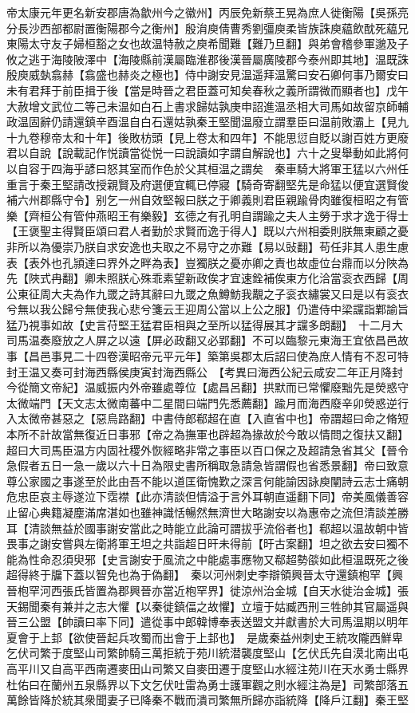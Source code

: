 帝太康元年更名新安郡唐為歙州今之徽州】丙辰免新蔡王晃為庶人徙衡陽【吳孫亮分長沙西部都尉置衡陽郡今之衡州】殷㳙庾倩曹秀劉彊庾柔皆族誅庾藴飲酖死藴兄東陽太守友子婦桓豁之女也故温特赦之庾希聞難【難乃旦翻】與弟會稽參軍邈及子攸之逃于海陵陂澤中【海陵縣前漢屬臨淮郡後漢晉屬廣陵郡今泰州即其地】温既誅殷庾威埶翕赫【翕盛也赫炎之極也】侍中謝安見温遥拜温驚曰安石卿何事乃爾安曰未有君拜于前臣揖于後【當是時晉之君臣蓋可知矣春秋之義所謂微而顯者也】戊午大赦增文武位二等己未温如白石上書求歸姑孰庚申詔進温丞相大司馬如故留京師輔政温固辭仍請還鎮辛酉温自白石還姑孰秦王堅聞温廢立謂羣臣曰温前敗灞上【見九十九卷穆帝太和十年】後敗枋頭【見上卷太和四年】不能思愆自貶以謝百姓方更廢君以自說【說載記作悦讀當從悦一曰說讀如字謂自解說也】六十之叟舉動如此將何以自容于四海乎諺曰怒其室而作色於父其桓温之謂矣　秦車騎大將軍王猛以六州任重言于秦王堅請改授親賢及府選便宜輒已停寢【騎奇寄翻堅先是命猛以便宜選賢俊補六州郡縣守令】别乞一州自效堅報曰朕之于卿義則君臣親踰骨肉雖復桓昭之有管樂【齊桓公有管仲燕昭王有樂毅】玄德之有孔明自謂踰之夫人主勞于求才逸于得士【王褒聖主得賢臣頌曰君人者勤於求賢而逸于得人】既以六州相委則朕無東顧之憂非所以為優崇乃朕自求安逸也夫取之不易守之亦難【易以䜴翻】苟任非其人患生慮表【表外也孔頴達曰界外之畔為表】豈獨朕之憂亦卿之責也故虛位台鼎而以分陜為先【陜式冉翻】卿未照朕心殊乖素望新政俟才宜速銓補俟東方化洽當衮衣西歸【周公東征周大夫為作九罭之詩其辭曰九罭之魚鱒魴我覯之子衮衣繡裳又曰是以有衮衣兮無以我公歸兮無使我心悲兮箋云王迎周公當以上公之服】仍遣侍中梁讜詣鄴諭旨猛乃視事如故【史言苻堅王猛君臣相與之至所以猛得展其才讜多朗翻】　十二月大司馬温奏廢放之人屏之以遠【屏必政翻又必郢翻】不可以臨黎元東海王宜依昌邑故事【昌邑事見二十四卷漢昭帝元平元年】築第吳郡太后詔曰使為庶人情有不忍可特封王温又奏可封海西縣侯庚寅封海西縣公　【考異曰海西公紀云咸安二年正月降封今從簡文帝紀】温威振内外帝雖處尊位【處昌呂翻】拱默而已常懼廢黜先是熒惑守太微端門【天文志太微南蕃中二星間曰端門先悉薦翻】踰月而海西廢辛卯熒惑逆行入太微帝甚惡之【惡烏路翻】中書侍郎郗超在直【入直省中也】帝謂超曰命之脩短本所不計故當無復近日事邪【帝之為撫軍也辟超為掾故於今敢以情問之復扶又翻】超曰大司馬臣温方内固社稷外恢經略非常之事臣以百口保之及超請急省其父【晉令急假者五日一急一歲以六十日為限史書所稱取急請急皆謂假也省悉景翻】帝曰致意尊公家國之事遂至於此由吾不能以道匡衛愧歎之深言何能諭因詠庾闡詩云志士痛朝危忠臣哀主辱遂泣下霑襟【此亦清談但情溢于言外耳朝直遥翻下同】帝美風儀善容止留心典籍凝塵滿席湛如也雖神識恬暢然無濟世大略謝安以為惠帝之流但清談差勝耳【清談無益於國事謝安當此之時能立此論可謂拔乎流俗者也】郗超以温故朝中皆畏事之謝安嘗與左衛將軍王坦之共詣超日旰未得前【旴古案翻】坦之欲去安曰獨不能為性命忍須臾邪【史言謝安于風流之中能處事應物又郗超勢燄如此桓温既死之後超得終于牖下蓋以智免也為于偽翻】　秦以河州刺史李辯領興晉太守還鎮枹罕【興晉枹罕河西張氏皆置為郡興晉亦當近枹罕界】徙涼州治金城【自天水徙治金城】張天錫聞秦有兼并之志大懼【以秦徙鎮偪之故懼】立壇于姑臧西刑三牲帥其官屬遥與晉三公盟【帥讀曰率下同】遣從事中郎韓博奉表送盟文并獻書於大司馬温期以明年夏會于上邽【欲使晉起兵攻蜀而出會于上邽也】　是歲秦益州刺史王統攻隴西鮮卑乞伏司繁于度堅山司繁帥騎三萬拒統于苑川統潜襲度堅山【乞伏氏先自漠北南出屯高平川又自高平西南遷麥田山司繁又自麥田遷于度堅山水經注苑川在天水勇士縣界杜佑曰在蘭州五泉縣界以下文乞伏吐雷為勇士護軍觀之則水經注為是】司繁部落五萬餘皆降於統其衆聞妻子已降秦不戰而潰司繁無所歸亦詣統降【降戶江翻】秦王堅